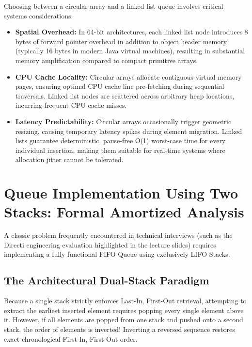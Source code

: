 \documentclass[10pt,journal,compsoc,onecolumn]{IEEEtran}
\begin{document}
Choosing between a circular array and a linked list queue involves critical systems considerations:
\begin{itemize}
    \item \textbf{Spatial Overhead:} In 64-bit architectures, each linked list node introduces 8 bytes of forward pointer overhead in addition to object header memory (typically 16 bytes in modern Java virtual machines), resulting in substantial memory amplification compared to compact primitive arrays.
    \item \textbf{CPU Cache Locality:} Circular arrays allocate contiguous virtual memory pages, ensuring optimal CPU cache line pre-fetching during sequential traversals. Linked list nodes are scattered across arbitrary heap locations, incurring frequent CPU cache misses.
    \item \textbf{Latency Predictability:} Circular arrays occasionally trigger geometric resizing, causing temporary latency spikes during element migration. Linked lists guarantee deterministic, pause-free O(1) worst-case time for every individual insertion, making them suitable for real-time systems where allocation jitter cannot be tolerated.
\end{itemize}

\section{Queue Implementation Using Two Stacks: Formal Amortized Analysis}
\label{sec:stacks_queue}

A classic problem frequently encountered in technical interviews (such as the Directi engineering evaluation highlighted in the lecture slides) requires implementing a fully functional FIFO Queue using exclusively LIFO Stacks.

\subsection{The Architectural Dual-Stack Paradigm}

Because a single stack strictly enforces Last-In, First-Out retrieval, attempting to extract the earliest inserted element requires popping every single element above it. However, if all elements are popped from one stack and pushed onto a second stack, the order of elements is inverted! Inverting a reversed sequence restores exact chronological First-In, First-Out order.
\end{document}
